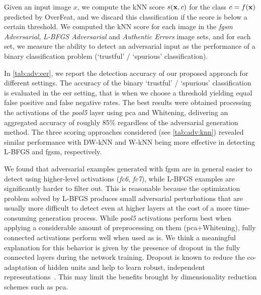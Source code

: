 Given an input image $x$, we compute the kNN score $s(\mathbf{x}, c)$ for the class $c = f(\mathbf{x})$ predicted by OverFeat, and we discard this classification if the score is below a certain threshold.
We computed the kNN score for each image in the \emph{\gls{fgsm} Adversarial}, \emph{L-BFGS Adversarial} and \emph{Authentic Errors} image sets, and for each set, we measure the ability to detect an adversarial input as the performance of a binary classification problem (`trustful' / `spurious' classification).


In \ref{tab:adv:eer}, we report the detection accuracy of our proposed approach for different settings. %
The accuracy of the binary `trustful' / `spurious' classification is evaluated in the \acrfull{eer} setting, that is when we choose a threshold yielding equal false positive and false negative rates.
The best results were obtained processing the activations of the \emph{pool5} layer using \gls{pca} and Whitening, delivering an aggregated accuracy of roughly 85\% regardless of the adversarial generation method.
The three scoring approaches considered (see \ref{tab:adv:knn}) revealed similar performance with DW-kNN and W-kNN being more effective in detecting L-BFGS and \gls{fgsm}, respectively.

We found that adversarial examples generated with \gls{fgsm} are in general easier to detect using higher-level activations (\emph{fc6}, \emph{fc7}), while L-BFGS examples are significantly harder to filter out.
This is reasonable because the optimization problem solved by L-BFGS produces small adversarial perturbations that are usually more difficult to detect even at higher layers at the cost of a more time-consuming generation process.
While \emph{pool5} activations perform best when applying a considerable amount of preprocessing on them (\gls{pca}+Whitening), fully connected activations perform well when used as is.
We think a meaningful explanation for this behavior is given by the presence of dropout in the fully connected layers during the network training.
Dropout is known to reduce the co-adaptation of hidden units and help to learn robust, independent representations~\cite{srivastava2014dropout}.
This may limit the benefits brought by dimensionality reduction schemes such as \gls{pca}.

